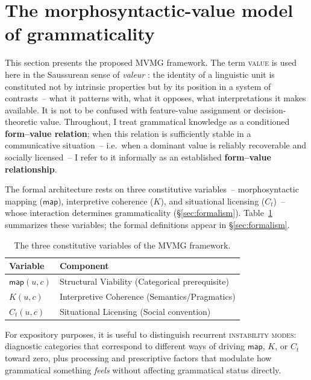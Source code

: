 \documentclass[12pt,letterpaper]{article}
\newcommand{\term}[1]{\textsc{#1}}
\newcommand{\mention}[1]{\textit{#1}}
\begin{document}
\section{The morphosyntactic-value model of grammaticality}\label{sec:framework}

This section presents the proposed MVMG framework. The term \term{value} is used here in the Saussurean sense of \mention{valeur} \autocite{saussure1916}: the identity of a linguistic unit is constituted not by intrinsic properties but by its position in a system of contrasts~-- what it patterns with, what it opposes, what interpretations it makes available. It is not to be confused with feature-value assignment or decision-theoretic value. Throughout, I treat grammatical knowledge as a conditioned \textbf{form--value relation}; when this relation is sufficiently stable in a communicative situation~-- i.e.~when a dominant value is reliably recoverable and socially licensed~-- I refer to it informally as an established \textbf{form--value relationship}.

The formal architecture rests on three constitutive variables~-- morphosyntactic mapping ($\mathsf{map}$), interpretive coherence ($K$), and situational licensing ($C_t$)~-- whose interaction determines grammaticality (\S\ref{sec:formalism}). Table~\ref{tab:vars} summarizes these variables; the formal definitions appear in \S\ref{sec:formalism}.

\begin{table}[H]
\centering
\begin{tabular}{ll}
\toprule
Variable & Component \\
\midrule
$\mathsf{map}(u,c)$ & Structural Viability (Categorical prerequisite) \\
$K(u,c)$ & Interpretive Coherence (Semantics/Pragmatics) \\
$C_t(u,c)$ & Situational Licensing (Social convention) \\
\bottomrule
\end{tabular}
\caption{The three constitutive variables of the MVMG framework.}
\label{tab:vars}
\end{table}

For expository purposes, it is useful to distinguish recurrent \term{instability modes}: diagnostic categories that correspond to different ways of driving $\mathsf{map}$, $K$, or $C_t$ toward zero, plus processing and prescriptive factors that modulate how grammatical something \emph{feels} without affecting grammatical status directly.
\end{document}
